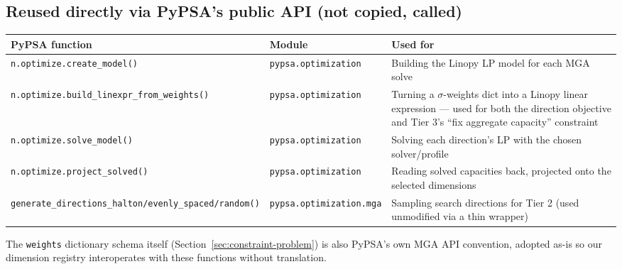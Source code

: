 \documentclass[11pt]{article}
\begin{document}
\subsection{Reused directly via PyPSA's public API (not copied, called)}
\begingroup
\newcommand{\fnbreak}[1]{\allowbreak\texttt{#1}}
\begin{table}[h]
\centering
\small
\begin{tabular}{@{}p{4.7cm}p{2.6cm}p{7.4cm}@{}}
\toprule
\textbf{PyPSA function} & \textbf{Module} & \textbf{Used for} \\
\midrule
\texttt{n}\fnbreak{.optimize}\fnbreak{.create\_model()} & \texttt{pypsa}\fnbreak{.optimization} &
  Building the Linopy LP model for each MGA solve \\
\texttt{n}\fnbreak{.optimize}\fnbreak{.build\_linexpr\_}\allowbreak\texttt{from\_weights()} & \texttt{pypsa}\fnbreak{.optimization} &
  Turning a $\sigma$-weights dict into a Linopy linear expression --- used
  for both the direction objective and Tier 3's ``fix aggregate capacity''
  constraint \\
\texttt{n}\fnbreak{.optimize}\fnbreak{.solve\_model()} & \texttt{pypsa}\fnbreak{.optimization} &
  Solving each direction's LP with the chosen solver/profile \\
\texttt{n}\fnbreak{.optimize}\fnbreak{.project\_solved()} & \texttt{pypsa}\fnbreak{.optimization} &
  Reading solved capacities back, projected onto the selected dimensions \\
\texttt{generate\_directions\_}\allowbreak\texttt{halton}\fnbreak{/evenly\_spaced}\fnbreak{/random()} & \texttt{pypsa}\fnbreak{.optimization}\fnbreak{.mga} &
  Sampling search directions for Tier 2 (used unmodified via a thin
  wrapper) \\
\bottomrule
\end{tabular}
\end{table}
\endgroup

The \texttt{weights} dictionary schema itself (Section~\ref{sec:constraint-problem})
is also PyPSA's own MGA API convention, adopted as-is so our dimension
registry interoperates with these functions without translation.
\end{document}
